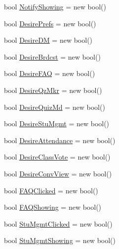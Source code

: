 \begin{DoxyCompactItemize}
bool \hyperlink{class_sr_p___classroom_inq_1_1frm_classrrom_inq_a13f540b89ba154a7b133ae266eeb18aa}{\-Notify\-Showing} = new bool()
\item 
bool \hyperlink{class_sr_p___classroom_inq_1_1frm_classrrom_inq_a263bbbace2f9c25e5f92573e5f4845ba}{\-Desire\-Prefs} = new bool()
\item 
bool \hyperlink{class_sr_p___classroom_inq_1_1frm_classrrom_inq_a8f8f9bb905b290fa448b445560458f89}{\-Desire\-D\-M} = new bool()
\item 
bool \hyperlink{class_sr_p___classroom_inq_1_1frm_classrrom_inq_ab67298a2e18c70080e8cc5e604223679}{\-Desire\-Brdcst} = new bool()
\item 
bool \hyperlink{class_sr_p___classroom_inq_1_1frm_classrrom_inq_ac893a3454dc239c417d6a1e67882d0cb}{\-Desire\-F\-A\-Q} = new bool()
\item 
bool \hyperlink{class_sr_p___classroom_inq_1_1frm_classrrom_inq_a6be0280a203b7fa9cfda5d8d1703d81a}{\-Desire\-Qz\-Mkr} = new bool()
\item 
bool \hyperlink{class_sr_p___classroom_inq_1_1frm_classrrom_inq_afe88ba4ba5644eaceb0edd49fa307c61}{\-Desire\-Quiz\-Md} = new bool()
\item 
bool \hyperlink{class_sr_p___classroom_inq_1_1frm_classrrom_inq_acc0266ba1df8a99c08f9f4ad95c01252}{\-Desire\-Stu\-Mgmt} = new bool()
\item 
bool \hyperlink{class_sr_p___classroom_inq_1_1frm_classrrom_inq_a2f4a98083518f487399985a1b76d44b5}{\-Desire\-Attendance} = new bool()
\item 
bool \hyperlink{class_sr_p___classroom_inq_1_1frm_classrrom_inq_af51d439b56b35a3b7d8fdaa6bb5252cd}{\-Desire\-Class\-Vote} = new bool()
\item 
bool \hyperlink{class_sr_p___classroom_inq_1_1frm_classrrom_inq_a3bd81e817c525b0cf0f1a0ae53e527d3}{\-Desire\-Conv\-View} = new bool()
\item 
bool \hyperlink{class_sr_p___classroom_inq_1_1frm_classrrom_inq_a2b3fd84c890215dd61c54946b49906d2}{\-F\-A\-Q\-Clicked} = new bool()
\item 
bool \hyperlink{class_sr_p___classroom_inq_1_1frm_classrrom_inq_a37a892198dda5bfa752c66df2debb199}{\-F\-A\-Q\-Showing} = new bool()
\item 
bool \hyperlink{class_sr_p___classroom_inq_1_1frm_classrrom_inq_ad0a57ebb96913cfbb9622d8c4c7b52cb}{\-Stu\-Mgmt\-Clicked} = new bool()
\item 
bool \hyperlink{class_sr_p___classroom_inq_1_1frm_classrrom_inq_a6a40312dc72ead57d8d40d415ee14a07}{\-Stu\-Mgmt\-Showing} = new bool()

\end{DoxyCompactItemize}
